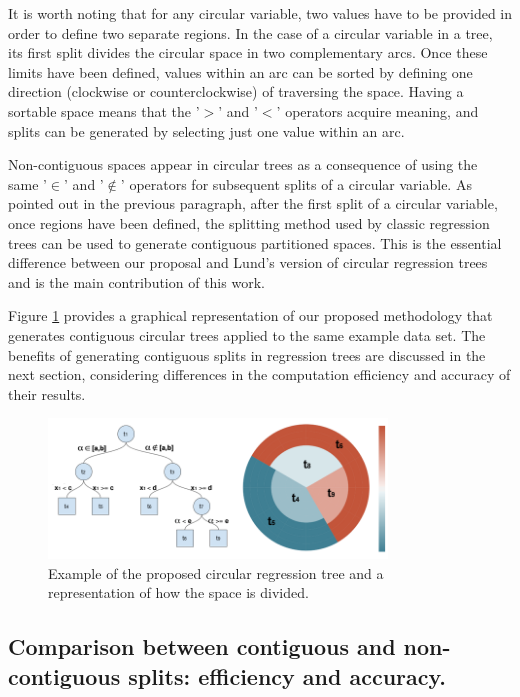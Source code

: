 \documentclass[times,twocolumn,final,authoryear]{elsarticle}
\begin{document}
It is worth noting that for any circular variable, two values have to be provided in order to define two separate regions. In the case of a circular variable in a tree, its first split divides the circular space in two complementary arcs. Once these limits have been defined, values within an arc can be sorted by defining one direction (clockwise or counterclockwise) of traversing the space. Having a sortable space means that the '$>$' and '$<$' operators acquire meaning, and splits can be generated by selecting just one value within an arc.

Non-contiguous spaces appear in circular trees as a consequence of using the same '$\in$' and '$\notin$' operators for subsequent splits of a circular variable. As pointed out in the previous paragraph, after the first split of a circular variable, once regions have been defined, the splitting method used by classic regression trees can be used to generate contiguous partitioned spaces. This is the essential difference between our proposal and Lund's version of circular regression trees and is the main contribution of this work.

Figure \ref{f4} provides a graphical representation of our proposed methodology that generates contiguous circular trees applied to the same example data set. The benefits of generating contiguous splits in regression trees are discussed in the next section, considering differences in the computation efficiency and accuracy of their results.

%
\begin{figure}
  \includegraphics[width=9cm]{fig4_master.png}
\caption{Example of the proposed circular regression tree and a representation of how the space is divided.}
\label{f4}       %
\end{figure}
%


\subsection{Comparison between contiguous and non-contiguous splits: efficiency and accuracy.} 
\end{document}
